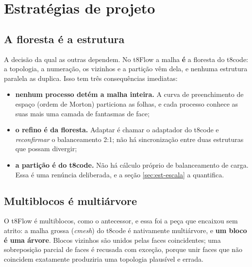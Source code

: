 \section{Estratégias de projeto}
\label{sec:estrategias}


\subsection{A floresta é a estrutura}

A decisão da qual as outras dependem. No t8Flow a malha \textbf{é} a floresta do
t8code: a topologia, a numeração, os vizinhos e a partição vêm dela, e nenhuma
estrutura paralela as duplica. Isso tem três consequências imediatas:

\begin{itemize}
\item \textbf{nenhum processo detém a malha inteira.} A curva de preenchimento
      de espaço (ordem de Morton) particiona as folhas, e cada processo conhece
      as suas mais uma camada de fantasmas de face;
\item \textbf{o refino é da floresta.} Adaptar é chamar o adaptador do t8code e
      \emph{reconfirmar} o balanceamento 2:1; não há sincronização entre duas
      estruturas que possam divergir;
\item \textbf{a partição é do t8code.} Não há cálculo próprio de balanceamento de
      carga. Essa é uma renúncia deliberada, e a seção \ref{sec:est-escala} a
      quantifica.
\end{itemize}

\subsection{Multiblocos é multiárvore}

O t8Flow é multiblocos, como o antecessor, e essa foi a peça que encaixou sem
atrito: a malha grossa (\emph{cmesh}) do t8code é nativamente multiárvore, e
\textbf{um bloco é uma árvore}. Blocos vizinhos são unidos pelas faces
coincidentes; uma sobreposição parcial de faces é recusada com exceção, porque
unir faces que não coincidem exatamente produziria uma topologia plausível e
errada.

